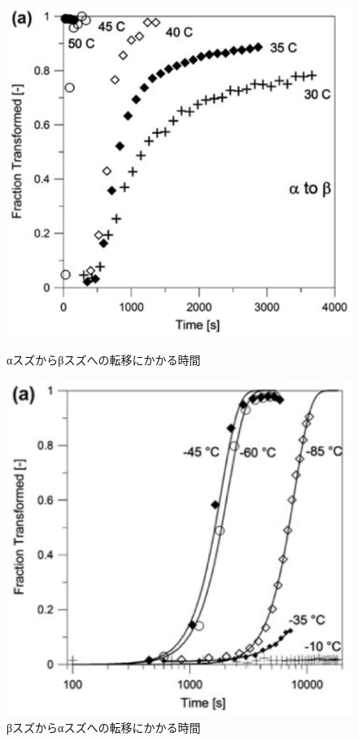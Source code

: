 \begin{figure}[!h]
 \begin{minipage}{0.5\hsize}
  \begin{center}
   \includegraphics[width=\hsize]{Introduction/alpha-to-beta.eps}
  \end{center}
  \caption{αスズからβスズへの転移にかかる時間}
  \label{fig:alpha-to-beta}
 \end{minipage}
 \begin{minipage}{0.5\hsize}
    \begin{center}
   \includegraphics[width=\hsize]{Introduction/beta-to-alpha.eps}
  \end{center}
  \caption{βスズからαスズへの転移にかかる時間}
  \label{fig:beta-to-alpha}
 \end{minipage}
\end{figure}

